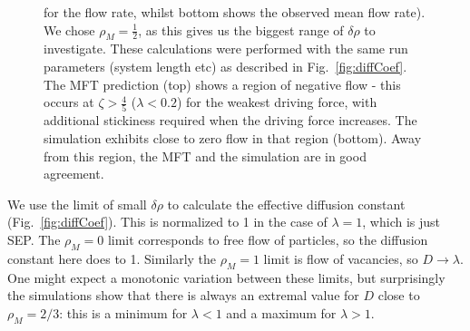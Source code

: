 \documentclass[
reprint, amsmath,amssymb, aps,
 pre, longbibliography,
]{revtex4-1}
\begin{document}
\begin{figure}[h!]
{for the flow rate, whilst bottom shows the observed mean flow rate).
We chose $\rho_M=\frac{1}{2}$, as this gives us the biggest range of $\delta\rho$ to investigate.
These calculations were performed with the same run parameters (system length etc) as described in Fig.~\ref{fig:diffCoef}.
The MFT prediction (top) shows a region of
negative flow - this occurs at $\zeta > \frac{4}{5}$ ($\lambda < 0.2$) for the weakest
driving force, with additional stickiness required when the driving
force increases. The simulation exhibits close to zero flow in that
region (bottom).  Away from this region, the MFT and
the simulation are in good agreement.
}
\end{figure}
We use the limit of small $\delta\rho$ to calculate the effective
diffusion constant (Fig.~\ref{fig:diffCoef}).  This is normalized to 1 in the case of
$\lambda=1$, which is just SEP.  The $\rho_M=0$ limit corresponds to
free flow of particles, so the diffusion constant here does to
1. Similarly the $\rho_M=1$ limit is flow of vacancies, so
$D\rightarrow\lambda$.  One might expect a monotonic variation between
these limits, but surprisingly the simulations show that there is
always an extremal value for $D$ close to $\rho_M=2/3$: this is a
minimum for $\lambda<1$ and a maximum for $\lambda>1$.
\end{document}
